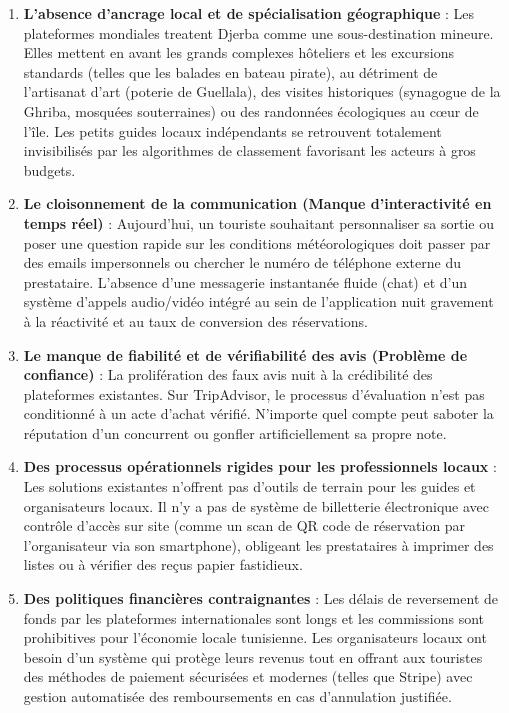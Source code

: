 \documentclass[12pt,a4paper]{report}
\begin{document}
\begin{enumerate}
    \item \textbf{L’absence d'ancrage local et de spécialisation géographique} :
    Les plateformes mondiales treatent Djerba comme une sous-destination mineure. Elles mettent en avant les grands complexes hôteliers et les excursions standards (telles que les balades en bateau pirate), au détriment de l'artisanat d'art (poterie de Guellala), des visites historiques (synagogue de la Ghriba, mosquées souterraines) ou des randonnées écologiques au cœur de l'île. Les petits guides locaux indépendants se retrouvent totalement invisibilisés par les algorithmes de classement favorisant les acteurs à gros budgets.

    \item \textbf{Le cloisonnement de la communication (Manque d'interactivité en temps réel)} :
    Aujourd'hui, un touriste souhaitant personnaliser sa sortie ou poser une question rapide sur les conditions météorologiques doit passer par des emails impersonnels ou chercher le numéro de téléphone externe du prestataire. L'absence d'une messagerie instantanée fluide (chat) et d'un système d'appels audio/vidéo intégré au sein de l'application nuit gravement à la réactivité et au taux de conversion des réservations.

    \item \textbf{Le manque de fiabilité et de vérifiabilité des avis (Problème de confiance)} :
    La prolifération des faux avis nuit à la crédibilité des plateformes existantes. Sur TripAdvisor, le processus d'évaluation n'est pas conditionné à un acte d'achat vérifié. N'importe quel compte peut saboter la réputation d'un concurrent ou gonfler artificiellement sa propre note.

    \item \textbf{Des processus opérationnels rigides pour les professionnels locaux} :
    Les solutions existantes n'offrent pas d'outils de terrain pour les guides et organisateurs locaux. Il n'y a pas de système de billetterie électronique avec contrôle d'accès sur site (comme un scan de QR code de réservation par l'organisateur via son smartphone), obligeant les prestataires à imprimer des listes ou à vérifier des reçus papier fastidieux.

    \item \textbf{Des politiques financières contraignantes} :
    Les délais de reversement de fonds par les plateformes internationales sont longs et les commissions sont prohibitives pour l'économie locale tunisienne. Les organisateurs locaux ont besoin d'un système qui protège leurs revenus tout en offrant aux touristes des méthodes de paiement sécurisées et modernes (telles que Stripe) avec gestion automatisée des remboursements en cas d'annulation justifiée.
\end{enumerate}
\end{document}
